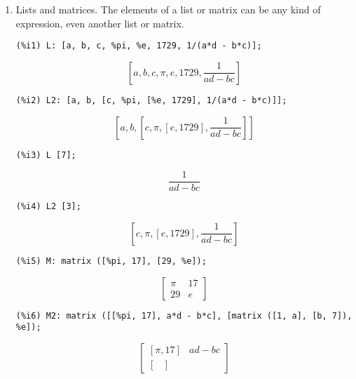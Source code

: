 \documentclass[12pt,leqno]{article}
\begin{document}
\begin{enumerate}
\item Lists and matrices.
The elements of a list or matrix can be any kind of expression,
even another list or matrix.
\begin{verbatim}
(%i1) L: [a, b, c, %pi, %e, 1729, 1/(a*d - b*c)];
\end{verbatim}
\begin{dmath}[number={\(\mathop{\mathrm{\%o}_{1}}\)}]
\left[a, b, c, \pi, e, 1729, \frac{1}{a d-b c}\right]
\end{dmath}
\begin{verbatim}
(%i2) L2: [a, b, [c, %pi, [%e, 1729], 1/(a*d - b*c)]];
\end{verbatim}
\begin{dmath}[number={\(\mathop{\mathrm{\%o}_{2}}\)}]
\left[a, b, \left[c, \pi, \left[e, 1729\right], \frac{1}{a d-b c}\right]\right]
\end{dmath}
\begin{verbatim}
(%i3) L [7];
\end{verbatim}
\begin{dmath}[number={\(\mathop{\mathrm{\%o}_{3}}\)}]
\frac{1}{a d-b c}
\end{dmath}
\begin{verbatim}
(%i4) L2 [3];
\end{verbatim}
\begin{dmath}[number={\(\mathop{\mathrm{\%o}_{4}}\)}]
\left[c, \pi, \left[e, 1729\right], \frac{1}{a d-b c}\right]
\end{dmath}
\begin{verbatim}
(%i5) M: matrix ([%pi, 17], [29, %e]);
\end{verbatim}
\begin{dmath}[number={\(\mathop{\mathrm{\%o}_{5}}\)}]
\begin{bmatrix}
  \pi & 17\\
  29 & e
\end{bmatrix}
\end{dmath}
\begin{verbatim}
(%i6) M2: matrix ([[%pi, 17], a*d - b*c], [matrix ([1, a], [b, 7]), %e]);
\end{verbatim}
\begin{dmath}[number={\(\mathop{\mathrm{\%o}_{6}}\)}]
\begin{bmatrix}
  \left[\pi, 17\right] & a d-b c\\
  \begin{bmatrix}

\end{bmatrix}
\end{bmatrix}
\end{dmath}
\end{enumerate}
\end{document}
